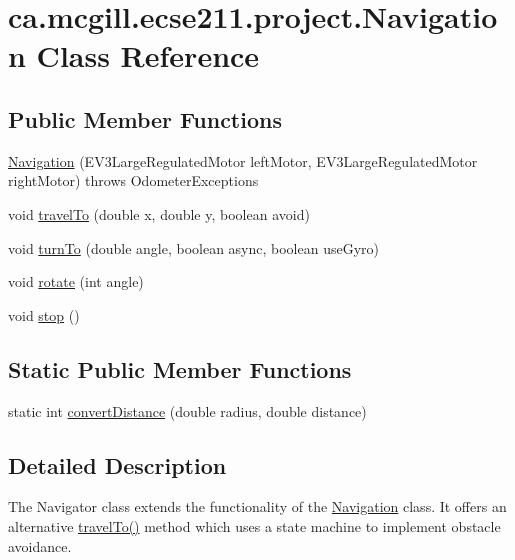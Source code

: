\hypertarget{classca_1_1mcgill_1_1ecse211_1_1project_1_1_navigation}{}\section{ca.\+mcgill.\+ecse211.\+project.\+Navigation Class Reference}
\label{classca_1_1mcgill_1_1ecse211_1_1project_1_1_navigation}
\subsection*{Public Member Functions}
\begin{DoxyCompactItemize}
\item 
\hyperlink{classca_1_1mcgill_1_1ecse211_1_1project_1_1_navigation_aaee14b67c392ddd951e3ce21224c3e56}{Navigation} (E\+V3\+Large\+Regulated\+Motor left\+Motor, E\+V3\+Large\+Regulated\+Motor right\+Motor)  throws Odometer\+Exceptions 
\item 
void \hyperlink{classca_1_1mcgill_1_1ecse211_1_1project_1_1_navigation_ada8a324c1d391698164476d4d728f0c4}{travel\+To} (double x, double y, boolean avoid)
\item 
void \hyperlink{classca_1_1mcgill_1_1ecse211_1_1project_1_1_navigation_a8b363632288a415edb9d32932555d233}{turn\+To} (double angle, boolean async, boolean use\+Gyro)
\item 
void \hyperlink{classca_1_1mcgill_1_1ecse211_1_1project_1_1_navigation_af2bddd9a34ea26cfd9a1e4ac055644dc}{rotate} (int angle)
\item 
void \hyperlink{classca_1_1mcgill_1_1ecse211_1_1project_1_1_navigation_ae8530d181ffd790ff9dea5eeab54b1a1}{stop} ()
\end{DoxyCompactItemize}
\subsection*{Static Public Member Functions}
\begin{DoxyCompactItemize}
\item 
static int \hyperlink{classca_1_1mcgill_1_1ecse211_1_1project_1_1_navigation_ac9e260bcd619ffa4820d7d0de7ea1c12}{convert\+Distance} (double radius, double distance)
\end{DoxyCompactItemize}


\subsection{Detailed Description}
The Navigator class extends the functionality of the \hyperlink{classca_1_1mcgill_1_1ecse211_1_1project_1_1_navigation}{Navigation} class. It offers an alternative \hyperlink{classca_1_1mcgill_1_1ecse211_1_1project_1_1_navigation_ada8a324c1d391698164476d4d728f0c4}{travel\+To()} method which uses a state machine to implement obstacle avoidance.

